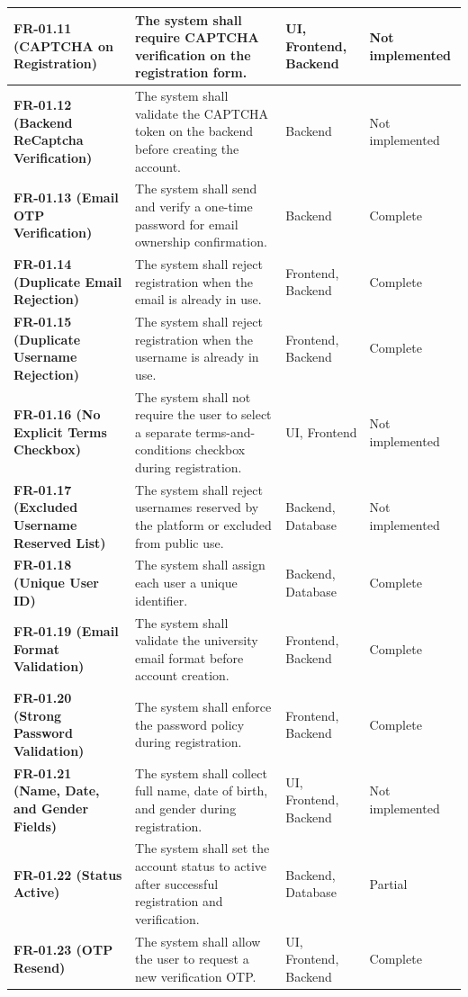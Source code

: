 \documentclass[12pt]{article}
\begin{document}
\begin{longtable}{|>{\raggedright\arraybackslash}p{}|>{\raggedright\arraybackslash}p{}|>{\raggedright\arraybackslash}p{}|>{\raggedright\arraybackslash}p{}|}
\textbf{FR-01.11 (CAPTCHA on Registration)} & The system shall require CAPTCHA verification on the registration form. & UI, Frontend, Backend & Not implemented \\ \hline
\textbf{FR-01.12 (Backend ReCaptcha Verification)} & The system shall validate the CAPTCHA token on the backend before creating the account. & Backend & Not implemented \\ \hline
\textbf{FR-01.13 (Email OTP Verification)} & The system shall send and verify a one-time password for email ownership confirmation. & Backend & Complete \\ \hline
\textbf{FR-01.14 (Duplicate Email Rejection)} & The system shall reject registration when the email is already in use. & Frontend, Backend & Complete \\ \hline
\textbf{FR-01.15 (Duplicate Username Rejection)} & The system shall reject registration when the username is already in use. & Frontend, Backend & Complete \\ \hline
\textbf{FR-01.16 (No Explicit Terms Checkbox)} & The system shall not require the user to select a separate terms-and-conditions checkbox during registration. & UI, Frontend & Not implemented \\ \hline
\textbf{FR-01.17 (Excluded Username Reserved List)} & The system shall reject usernames reserved by the platform or excluded from public use. & Backend, Database & Not implemented \\ \hline
\textbf{FR-01.18 (Unique User ID)} & The system shall assign each user a unique identifier. & Backend, Database & Complete \\ \hline
\textbf{FR-01.19 (Email Format Validation)} & The system shall validate the university email format before account creation. & Frontend, Backend & Complete \\ \hline
\textbf{FR-01.20 (Strong Password Validation)} & The system shall enforce the password policy during registration. & Frontend, Backend & Complete \\ \hline
\textbf{FR-01.21 (Name, Date, and Gender Fields)} & The system shall collect full name, date of birth, and gender during registration. & UI, Frontend, Backend & Not implemented \\ \hline
\textbf{FR-01.22 (Status Active)} & The system shall set the account status to active after successful registration and verification. & Backend, Database & Partial \\ \hline
\textbf{FR-01.23 (OTP Resend)} & The system shall allow the user to request a new verification OTP. & UI, Frontend, Backend & Complete \\ \hline

\end{longtable}
\end{document}
